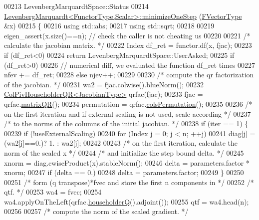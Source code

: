 \begin{DoxyCode}
00213 LevenbergMarquardtSpace::Status
00214 \hyperlink{class_eigen_1_1_levenberg_marquardt}{LevenbergMarquardt<FunctorType,Scalar>::minimizeOneStep}
      (\hyperlink{group___core___module}{FVectorType}  &x)
00215 \{
00216     \textcolor{keyword}{using} std::abs;
00217     \textcolor{keyword}{using} std::sqrt;
00218 
00219     eigen\_assert(x.size()==n); \textcolor{comment}{// check the caller is not cheating us}
00220 
00221     \textcolor{comment}{/* calculate the jacobian matrix. */}
00222     Index df\_ret = functor.df(x, fjac);
00223     \textcolor{keywordflow}{if} (df\_ret<0)
00224         \textcolor{keywordflow}{return} LevenbergMarquardtSpace::UserAsked;
00225     \textcolor{keywordflow}{if} (df\_ret>0)
00226         \textcolor{comment}{// numerical diff, we evaluated the function df\_ret times}
00227         nfev += df\_ret;
00228     \textcolor{keywordflow}{else} njev++;
00229 
00230     \textcolor{comment}{/* compute the qr factorization of the jacobian. */}
00231     wa2 = fjac.colwise().blueNorm();
00232     \hyperlink{group___q_r___module_class_eigen_1_1_col_piv_householder_q_r}{ColPivHouseholderQR<JacobianType>} qrfac(fjac);
00233     fjac = qrfac.\hyperlink{group___q_r___module_aa572ac050c8d4fadd4f08a87f6b1e62b}{matrixQR}();
00234     permutation = qrfac.\hyperlink{group___q_r___module_ab6ad43e6a6fb75726eae0d5499948f4a}{colsPermutation}();
00235 
00236     \textcolor{comment}{/* on the first iteration and if external scaling is not used, scale according */}
00237     \textcolor{comment}{/* to the norms of the columns of the initial jacobian. */}
00238     \textcolor{keywordflow}{if} (iter == 1) \{
00239         \textcolor{keywordflow}{if} (!useExternalScaling)
00240             \textcolor{keywordflow}{for} (Index j = 0; j < n; ++j)
00241                 diag[j] = (wa2[j]==0.)? 1. : wa2[j];
00242 
00243         \textcolor{comment}{/* on the first iteration, calculate the norm of the scaled x */}
00244         \textcolor{comment}{/* and initialize the step bound delta. */}
00245         xnorm = diag.cwiseProduct(x).stableNorm();
00246         delta = parameters.factor * xnorm;
00247         \textcolor{keywordflow}{if} (delta == 0.)
00248             delta = parameters.factor;
00249     \}
00250 
00251     \textcolor{comment}{/* form (q transpose)*fvec and store the first n components in */}
00252     \textcolor{comment}{/* qtf. */}
00253     wa4 = fvec;
00254     wa4.applyOnTheLeft(qrfac.\hyperlink{group___q_r___module_a28ab9d8916ca609c5469c4c192fbfa28}{householderQ}().adjoint());
00255     qtf = wa4.head(n);
00256 
00257     \textcolor{comment}{/* compute the norm of the scaled gradient. */}

\end{DoxyCode}
